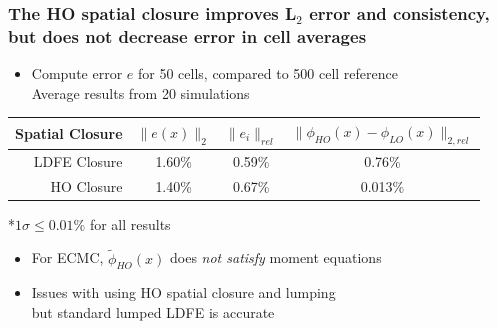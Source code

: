 \documentclass[xcolor=dvipsnames,hyperref={pdfpagelabels=false},unknownkeysallowed]{beamer}
\newcommand{\colG}[1]{{\color{Gray!110} #1}}
\newlength{\wideitemsep}
\let\olditem\item
\renewcommand{\item}{\setlength{\itemsep}{\wideitemsep}\olditem}
\begin{document}
\begin{frame}
    \frametitle{The HO spatial closure improves L$_2$ error and consistency, but does not decrease error in cell averages}
    \begin{itemize}
\item Compute error $e$ for 50 cells, compared to 500 cell reference \\ \colG{Average results from 20 simulations}
    \end{itemize}
        \begin{table}
            \begin{center}
    \begin{tabular}{r|ccc} \hline
        Spatial Closure & \multicolumn{1}{|c}{$\|e(x)\|_2$}  &
        \multicolumn{1}{c}{$\|e_i\|_{rel}$} & \multicolumn{1}{c}{$\|\phi_{HO}(x)
    -\phi_{LO}(x)\|_{2,rel}$} \\  \hline 
LDFE   Closure            &   1.60\%   &   0.59\%   &   0.76\%   \\
HO Closure        &   1.40\%  &   0.67\%     &   0.013\%  \\ \hline
    \end{tabular}
\end{center}
\colG{*$1\sigma \leq 0.01 \%$ for all results}
        \end{table}
    \begin{itemize}
        \item For ECMC, $\tilde \phi_{HO}(x)$ does \emph{not satisfy}  moment equations
        \item Issues with using HO spatial closure and lumping \\ \colG{but standard lumped LDFE is accurate}
    \end{itemize}
\end{frame}
\end{document}
